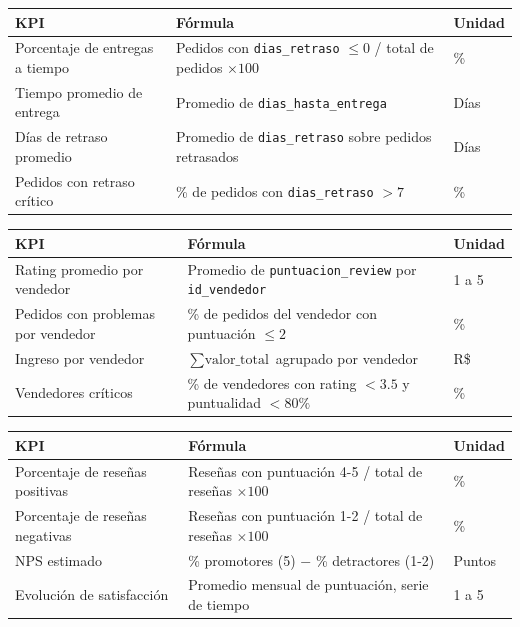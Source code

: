 \documentclass[11pt,a4paper]{article}
\begin{document}
\noindent\begin{tabularx}{\textwidth}{@{}L{4cm} X L{2.3cm}@{}}
\toprule
\textbf{KPI} & \textbf{Fórmula} & \textbf{Unidad} \\
\midrule
Porcentaje de entregas a tiempo & Pedidos con \texttt{dias\_retraso} $\leq 0$ / total de pedidos $\times 100$ & \% \\
Tiempo promedio de entrega & Promedio de \texttt{dias\_hasta\_entrega} & Días \\
Días de retraso promedio & Promedio de \texttt{dias\_retraso} sobre pedidos retrasados & Días \\
Pedidos con retraso crítico & \% de pedidos con \texttt{dias\_retraso} $> 7$ & \% \\
\bottomrule
\end{tabularx}

\noindent\begin{tabularx}{\textwidth}{@{}L{4cm} X L{2.3cm}@{}}
\toprule
\textbf{KPI} & \textbf{Fórmula} & \textbf{Unidad} \\
\midrule
Rating promedio por vendedor & Promedio de \texttt{puntuacion\_review} por \texttt{id\_vendedor} & 1 a 5 \\
Pedidos con problemas por vendedor & \% de pedidos del vendedor con puntuación $\leq 2$ & \% \\
Ingreso por vendedor & $\sum \text{valor\_total}$ agrupado por vendedor & R\$ \\
Vendedores críticos & \% de vendedores con rating $< 3.5$ y puntualidad $< 80\%$ & \% \\
\bottomrule
\end{tabularx}

\noindent\begin{tabularx}{\textwidth}{@{}L{4cm} X L{2.3cm}@{}}
\toprule
\textbf{KPI} & \textbf{Fórmula} & \textbf{Unidad} \\
\midrule
Porcentaje de reseñas positivas & Reseñas con puntuación 4-5 / total de reseñas $\times 100$ & \% \\
Porcentaje de reseñas negativas & Reseñas con puntuación 1-2 / total de reseñas $\times 100$ & \% \\
NPS estimado & \% promotores (5) $-$ \% detractores (1-2) & Puntos \\
Evolución de satisfacción & Promedio mensual de puntuación, serie de tiempo & 1 a 5 \\
\bottomrule
\end{tabularx}
\end{document}
